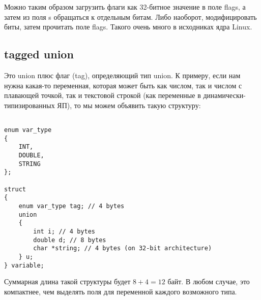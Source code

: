 Можно таким образом загрузить флаги как 32-битное значение в поле flags, а затем из поля s обращаться
к отдельным битам. Либо наоборот, модифицировать биты, затем прочитать поле flags. Такого очень много
в исходниках ядра Linux.

\subsection{tagged union}

Это union плюс флаг (tag), определяющий тип union. К примеру, если нам нужна какая-то переменная,
которая может быть как числом, так и числом с плавающей точкой, так и текстовой строкой (как переменные
в динамически-типизированных ЯП), то мы можем объявить такую структуру:

\begin{lstlisting}

enum var_type
{
	INT,
	DOUBLE,
	STRING
};

struct
{
	enum var_type tag; // 4 bytes
	union
	{
		int i; // 4 bytes
		double d; // 8 bytes
		char *string; // 4 bytes (on 32-bit architecture)
	} u;
} variable;
\end{lstlisting}

Суммарная длина такой структуры будет $8+4=12$ байт. В любом случае, это компактнее, чем выделять
поля для переменной каждого возможного типа.

